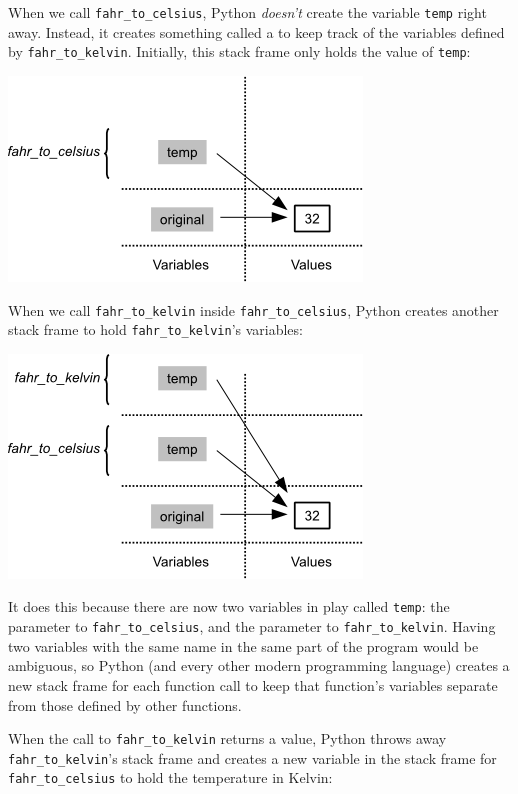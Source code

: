 \documentclass{book}
\begin{document}
When we call \texttt{fahr\_to\_celsius}, Python \emph{doesn't} create
the variable \texttt{temp} right away. Instead, it creates something
called a  to keep track of the
variables defined by \texttt{fahr\_to\_kelvin}. Initially, this stack
frame only holds the value of \texttt{temp}:

\includegraphics{novice/python/img/python-call-stack-02.png}

When we call \texttt{fahr\_to\_kelvin} inside
\texttt{fahr\_to\_celsius}, Python creates another stack frame to hold
\texttt{fahr\_to\_kelvin}'s variables:

\includegraphics{novice/python/img/python-call-stack-03.png}

It does this because there are now two variables in play called
\texttt{temp}: the parameter to \texttt{fahr\_to\_celsius}, and the
parameter to \texttt{fahr\_to\_kelvin}. Having two variables with the
same name in the same part of the program would be ambiguous, so Python
(and every other modern programming language) creates a new stack frame
for each function call to keep that function's variables separate from
those defined by other functions.

When the call to \texttt{fahr\_to\_kelvin} returns a value, Python
throws away \texttt{fahr\_to\_kelvin}'s stack frame and creates a new
variable in the stack frame for \texttt{fahr\_to\_celsius} to hold the
temperature in Kelvin:
\end{document}

